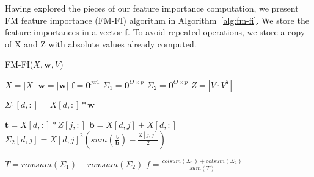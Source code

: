 \documentclass[10pt]{journal}
\begin{document}
Having explored the pieces of our feature importance computation, we present FM
feature importance (FM-FI) algorithm in Algorithm~\ref{alg:fm-fi}. We store the
feature importances in a vector $\bm{f}$. To avoid repeated operations, we store
a copy of X and Z with absolute values already computed.

\begin{algorithm}
    \caption{FM-FI($X, \bm{w}, V$)}
    \label{alg:fm-fi}
    \begin{algorithmic}[1]
        \State $X = |X|$  
        \State $\bm{w} = |\bm{w}|$
        \State $\bm{f} = \bm{0}^{j x 1}$
        \State $\Sigma_1 = \bm{0}^{O \times p}$
        \State $\Sigma_2 = \bm{0}^{O \times p}$
        \State $Z = |V \cdot V^T|$  
        \item[]
          
            \State $\Sigma_1[d,:] = X[d,:] * \bm{w}$
        \EndFor
        \item[]
          
                \State $\bm{t} = X[d,:] * Z[j,:]$
                \State $\bm{b} = X[d,j] + X[d,:]$
                \State $\Sigma_2[d,j] = X[d,j]^2
                    (sum(\frac{\bm{t}}{\bm{b}}) - \frac{Z[j,j]}{2})$
            \EndFor
        \EndFor
        \item[]
        \State $T = rowsum(\Sigma_1) + rowsum(\Sigma_2)$
        \State $f = \frac{colsum(\Sigma_1) + colsum(\Sigma_2)}{sum(T)}$

    \end{algorithmic}
\end{algorithm}




\end{document}
